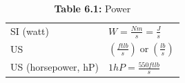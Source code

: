 \documentclass[
  letterpaper,
  DIV=11,
  numbers=noendperiod]{scrreprt}
\begin{document}
\begin{longtable}[]{@{}
  >{\raggedright\arraybackslash}p{}
  >{\raggedright\arraybackslash}p{}@{}}
\caption{\textbf{Table 6.1:} Power}\tabularnewline
\toprule\noalign{}
\endfirsthead
\endhead
\bottomrule\noalign{}
\endlastfoot
SI (watt) &
\(                                                                                                                                                                                                                                                        
                                                                                                                                                                                        W=\frac{N m}{s}=\frac{J}{s}                                                               
                                                                                                                                                                                        \) \\
US &
\(                                                                                                                                                                                                                                                        
                                                                                                                                                                                        \left(\frac{f t l b}{s}\right) \operatorname{or}\left(\frac{l b}{s}\right)                
                                                                                                                                                                                        \) \\
US (horsepower, hP) &
\(                                                                                                                                                                                                                                                        
                                                                                                                                                                                        1 h P=\frac{550 f t l b}{s}                                                               
                                                                                                                                                                                        \) \\
\end{longtable}
\end{document}

